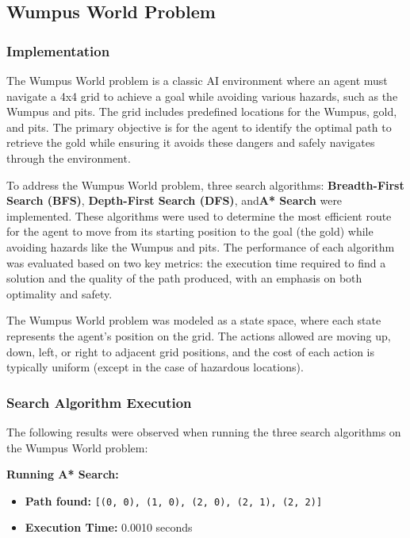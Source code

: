 \documentclass[12pt]{article}
\begin{document}
\subsection{Wumpus World Problem}

\subsubsection{Implementation}

The Wumpus World problem is a classic AI environment where an agent must navigate a 4x4 grid to achieve a goal while avoiding various hazards, such as the Wumpus and pits. The grid includes predefined locations for the Wumpus, gold, and pits. The primary objective is for the agent to identify the optimal path to retrieve the gold while ensuring it avoids these dangers and safely navigates through the environment.

To address the Wumpus World problem, three search algorithms: \textbf{Breadth-First Search (BFS)}, \textbf{Depth-First Search (DFS)}, and\textbf{A* Search}  were implemented. These algorithms were used to determine the most efficient route for the agent to move from its starting position to the goal (the gold) while avoiding hazards like the Wumpus and pits. The performance of each algorithm was evaluated based on two key metrics: the execution time required to find a solution and the quality of the path produced, with an emphasis on both optimality and safety.

The Wumpus World problem was modeled as a state space, where each state represents the agent's position on the grid. The actions allowed are moving up, down, left, or right to adjacent grid positions, and the cost of each action is typically uniform (except in the case of hazardous locations).

\subsubsection{Search Algorithm Execution}

The following results were observed when running the three search algorithms on the Wumpus World problem:

\textbf{Running A* Search:}
\begin{itemize}
    \item \textbf{Path found:} \texttt{[(0, 0), (1, 0), (2, 0), (2, 1), (2, 2)]}
    \item \textbf{Execution Time:} 0.0010 seconds
\end{itemize}
\end{document}
